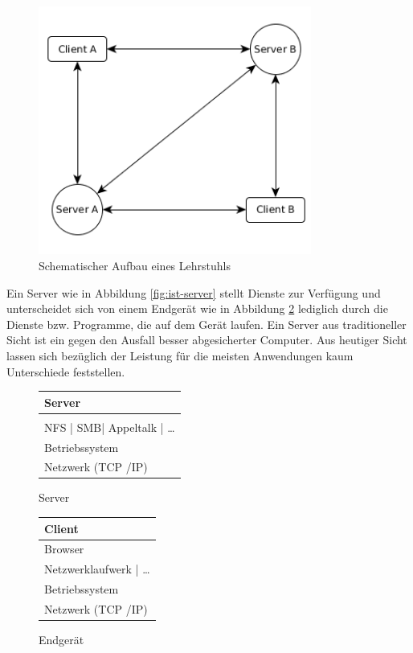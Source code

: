 \documentclass[oneside, ngerman, toc=bibliography,bibliography=totoc,listof=entryprefix, open=right,numbers=noenddot,fontsize=12pt]{scrbook}
\begin{document}
\begin{figure}[htbp] 
	\centering
	\includegraphics[width=0.8\textwidth]{Masterarbeit_Bilder/Lehrstuhl_Datentausch_intern.png}
	\caption{Schematischer Aufbau eines Lehrstuhls}
	\label{fig:ist-struktur2}
\end{figure}  

 Ein Server wie in Abbildung \ref{fig:ist-server} stellt Dienste zur Verfügung und unterscheidet sich von einem Endgerät wie in Abbildung \ref{fig:ist-endgeraet} lediglich durch die Dienste bzw. Programme, die auf dem Gerät laufen. Ein Server aus traditioneller Sicht ist ein gegen den Ausfall besser abgesicherter Computer. Aus heutiger Sicht lassen sich bezüglich der Leistung für die meisten Anwendungen kaum Unterschiede feststellen.
 
\begin{figure}[htbp] 
	\centering 
	\begin{minipage}{.5\textwidth}
	\begin{tabular}{|p{}|}
		\hline
Server\\ \hline\hline
\\
NFS | SMB| Appeltalk | \ldots \\ \hline
Betriebssystem \\ \hline
Netzwerk (TCP /IP) \\ \hline
	\end{tabular}
	 
	\caption{Server}
	\label{fig:ist-server}
\end{minipage}%
\begin{minipage}{.5\textwidth}
	\begin{tabular}{|p{}|}
 		\hline
		Client \\\hline\hline
		Browser \\ \hline
		Netzwerklaufwerk | \ldots \\ \hline
		Betriebssystem \\ \hline
		Netzwerk (TCP /IP) \\ \hline
	\end{tabular}
	\caption{Endgerät}
	\label{fig:ist-endgeraet}
\end{minipage}%
\end{figure}   
\end{document}
